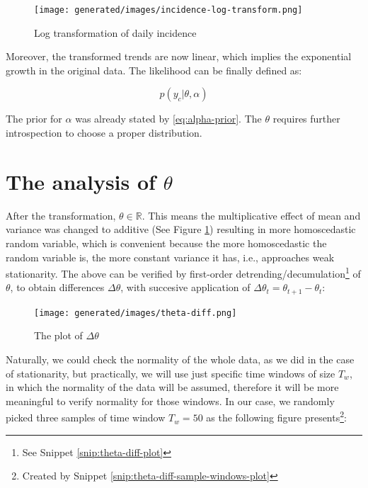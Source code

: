 \documentclass[
  digital, %
  oneside, %
  lof,     %
  lot,     %
]{fithesis4}
\begin{document}
\begin{figure}[H]
  \begin{center}
    \texttt{[image: generated/images/incidence-log-transform.png]}
  \end{center}
  \caption{Log transformation of daily incidence}
  \label{fig:incidence-log-transform}
\end{figure}

Moreover, the transformed trends are now linear, which implies the exponential growth in the original data.
The likelihood can be finally defined as:

\begin{equation}\label{eq:likelihood-first}
  p( y_c | \theta, \alpha )
\end{equation}

The prior for $\alpha$ was already stated by \eqref{eq:alpha-prior}.
The $\theta$ requires further introspection to choose a proper distribution.


\section{The analysis of \texorpdfstring{$\theta$}{Lg}}
\label{sec:theta-analysis}

After the transformation, $\theta \in \mathbb{R}$.
This means the multiplicative effect of mean and variance was changed to additive (See Figure \ref{fig:incidence-log-transform}) resulting in more homoscedastic random variable, which is convenient because the more homoscedastic the random variable is, the more constant variance it has, i.e., approaches weak stationarity.
The above can be verified by first-order detrending/decumulation\footnote{See Snippet \ref{snip:theta-diff-plot}} of $\theta$, to obtain differences $\Delta \theta$, with succesive application of $\Delta \theta_t = \theta_{t+1} - \theta_{t}$:

\begin{figure}[H]
  \begin{center}
    \texttt{[image: generated/images/theta-diff.png]}
  \end{center}
  \caption{The plot of $\Delta \theta$}
  \label{fig:theta-diff}
\end{figure}

Naturally, we could check the normality of the whole data, as we did in the case of stationarity, but practically, we will use just specific time windows of size $T_w$, in which the normality of the data will be assumed, therefore it will be more meaningful to verify normality for those windows.
In our case, we randomly picked three samples of time window $T_w = 50$ as the following figure presents\footnote{Created by Snippet \ref{snip:theta-diff-sample-windows-plot}}:
\end{document}
